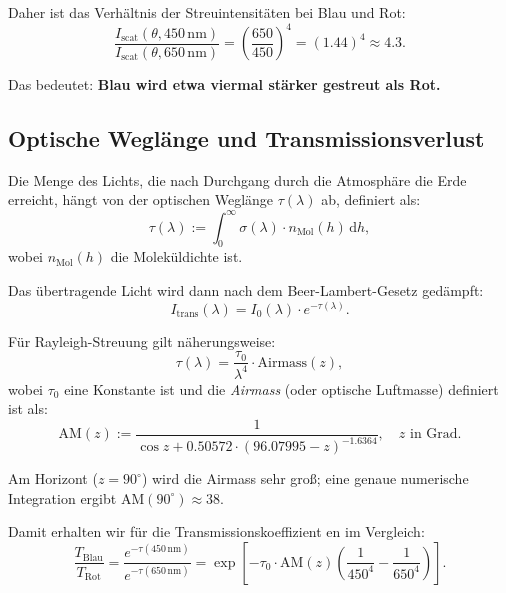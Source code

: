 \documentclass[12pt,a4paper]{article}
\begin{document}
Daher ist das Verhältnis der Streuintensitäten bei Blau und Rot:
\begin{equation}
	\frac{I_{\mathrm{scat}}(\theta, 450\,\mathrm{nm})}{I_{\mathrm{scat}}(\theta, 650\,\mathrm{nm})}
	= \left(\frac{650}{450}\right)^4 = (1.44)^4 \approx \boxed{4.3}.
	\label{eq:I_ratio_br}
\end{equation}

Das bedeutet: \textbf{Blau wird etwa viermal stärker gestreut als Rot.}

\subsection{Optische Weglänge und Transmissionsverlust}
\label{subsec:transmission}

Die Menge des Lichts, die nach Durchgang durch die Atmosphäre die Erde
erreicht, hängt von der optischen Weglänge $\tau(\lambda)$ ab,
definiert als:
\begin{equation}
	\tau(\lambda) := \int_0^\infty \sigma(\lambda) \cdot n_{\mathrm{Mol}}(h) \, \mathrm{d}h,
	\label{eq:optical_depth}
\end{equation}
wobei $n_{\mathrm{Mol}}(h)$ die Moleküldichte ist.

Das übertragende Licht wird dann nach dem Beer-Lambert-Gesetz gedämpft:
\begin{equation}
	I_{\mathrm{trans}}(\lambda) = I_0(\lambda) \cdot e^{-\tau(\lambda)}.
	\label{eq:transmission_law}
\end{equation}

Für Rayleigh-Streuung gilt näherungsweise:
\begin{equation}
	\tau(\lambda) = \frac{\tau_0}{\lambda^4} \cdot \mathrm{Airmass}(z),
	\label{eq:tau_airmass}
\end{equation}
wobei $\tau_0$ eine Konstante ist und die \emph{Airmass} (oder optische
Luftmasse) definiert ist als:
\begin{equation}
	\mathrm{AM}(z) := \frac{1}{\cos z + 0.50572 \cdot (96.07995 - z)^{-1.6364}},
	\quad z \text{ in Grad}.
	\label{eq:airmass}
\end{equation}

Am Horizont ($z = 90^\circ$) wird die Airmass sehr groß; eine genaue
numerische Integration ergibt $\mathrm{AM}(90^\circ) \approx 38$.

Damit erhalten wir für die Transmissionskoeffizient en im Vergleich:
\begin{equation}
	\frac{T_{\mathrm{Blau}}}{T_{\mathrm{Rot}}} = \frac{e^{-\tau(450\,\mathrm{nm})}}{e^{-\tau(650\,\mathrm{nm})}}
	= \exp\left[-\tau_0 \cdot \mathrm{AM}(z) \left(\frac{1}{450^4} - \frac{1}{650^4}\right)\right].
	\label{eq:T_ratio}
\end{equation}
\end{document}
